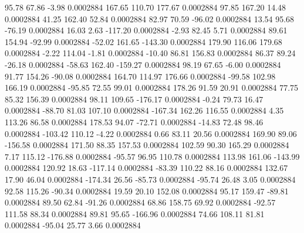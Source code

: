       95.78       67.86       -3.98     0.0002884
      167.65      110.70      177.67     0.0002884
       97.85      167.20       14.48     0.0002884
       41.25      162.40       52.84     0.0002884
       82.97       70.59      -96.02     0.0002884
       13.54       95.68      -76.19     0.0002884
       16.03        2.63     -117.20     0.0002884
       -2.93       82.45        5.71     0.0002884
       89.61      154.94      -92.99     0.0002884
      -52.02      161.65     -143.30     0.0002884
      179.90      116.06      179.68     0.0002884
       -2.22      114.04       -1.81     0.0002884
      -10.40       86.81      156.83     0.0002884
       86.37       89.24      -26.18     0.0002884
      -58.63      162.40     -159.27     0.0002884
       98.19       67.65       -6.00     0.0002884
       91.77      154.26      -90.08     0.0002884
      164.70      114.97      176.66     0.0002884
      -99.58      102.98      166.19     0.0002884
      -95.85       72.55       99.01     0.0002884
      178.26       91.59       20.91     0.0002884
       77.75       85.32      156.39     0.0002884
       98.11      109.65     -176.17     0.0002884
       -0.24       79.73       16.47     0.0002884
      -88.70       81.03      107.10     0.0002884
     -167.34      162.26      116.55     0.0002884
        4.35      113.26       86.58     0.0002884
      178.53       94.07      -72.71     0.0002884
      -14.83       72.48       98.46     0.0002884
     -103.42      110.12       -4.22     0.0002884
        0.66       83.11       20.56     0.0002884
      169.90       89.06     -156.58     0.0002884
      171.50       88.35      157.53     0.0002884
      102.59       90.30      165.29     0.0002884
        7.17      115.12     -176.88     0.0002884
      -95.57       96.95      110.78     0.0002884
      113.98      161.06     -143.99     0.0002884
      120.92       18.63     -117.14     0.0002884
      -83.39      110.22       88.16     0.0002884
      132.67       17.90       46.04     0.0002884
     -174.34       26.56      -85.73     0.0002884
      -95.74       26.48        3.05     0.0002884
       92.58      115.26      -90.34     0.0002884
       19.59       20.10      152.08     0.0002884
       95.17      159.47      -89.81     0.0002884
       89.50       62.84      -91.26     0.0002884
       68.86      158.75       69.92     0.0002884
      -92.57      111.58       88.34     0.0002884
       89.81       95.65     -166.96     0.0002884
       74.66      108.11       81.81     0.0002884
      -95.04       25.77        3.66     0.0002884
